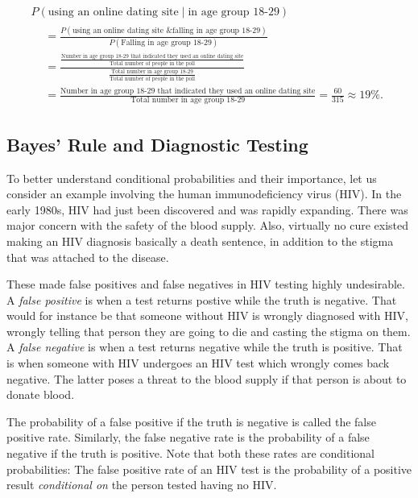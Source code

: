 \documentclass[]{book}
\theoremstyle{definition}
\theoremstyle{definition}
\theoremstyle{definition}
\theoremstyle{remark}
\begin{document}
\begin{multline*}
    P(\text{using an online dating site} \mid \text{in age group 18-29}) \\
\begin{split}
    &= \frac{P(\text{using an online dating site \& falling in age group 18-29})}{P(\text{Falling in age group 18-29})} \\
    &= \frac{\frac{\text{Number in age group 18-29 that indicated they used an online dating site}}{\text{Total number of people in the poll}}}{\frac{\text{Total number in age group 18-29}}{\text{Total number of people in the poll}}} \\
    &= \frac{\text{Number in age group 18-29 that indicated they used an online dating site}}{\text{Total number in age group 18-29}} = \frac{60}{315} \approx 19\%.
\end{split}
\end{multline*}

\subsection{Bayes' Rule and Diagnostic
Testing}\label{sec:diagnostic-testing}

To better understand conditional probabilities and their importance, let
us consider an example involving the human immunodeficiency virus (HIV).
In the early 1980s, HIV had just been discovered and was rapidly
expanding. There was major concern with the safety of the blood supply.
Also, virtually no cure existed making an HIV diagnosis basically a
death sentence, in addition to the stigma that was attached to the
disease.

These made false positives and false negatives in HIV testing highly
undesirable. A \emph{false positive} is when a test returns postive
while the truth is negative. That would for instance be that someone
without HIV is wrongly diagnosed with HIV, wrongly telling that person
they are going to die and casting the stigma on them. A \emph{false
negative} is when a test returns negative while the truth is positive.
That is when someone with HIV undergoes an HIV test which wrongly comes
back negative. The latter poses a threat to the blood supply if that
person is about to donate blood.

The probability of a false positive if the truth is negative is called
the false positive rate. Similarly, the false negative rate is the
probability of a false negative if the truth is positive. Note that both
these rates are conditional probabilities: The false positive rate of an
HIV test is the probability of a positive result \emph{conditional on}
the person tested having no HIV.
\end{document}
